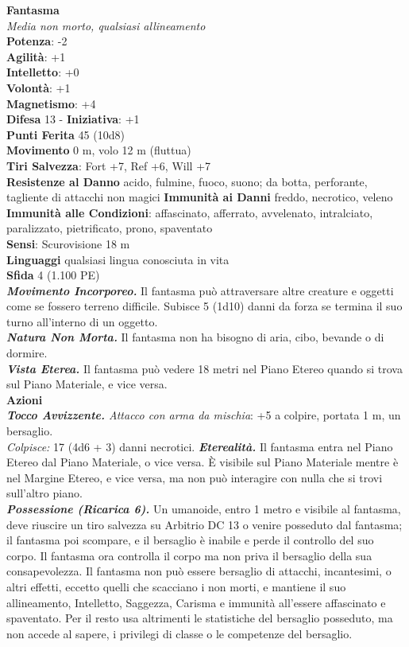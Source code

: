 \begin{multicols}{2}
\medskip\textbf{Fantasma}\\
\emph{Media non morto, qualsiasi allineamento}\\
\textbf{Potenza}: -2\\
\textbf{Agilità}: +1\\
\textbf{Intelletto}: +0\\
\textbf{Volontà}: +1\\
\textbf{Magnetismo}: +4\\
\textbf{Difesa} 13 - \textbf{Iniziativa}: +1\\
\textbf{Punti Ferita} 45 (10d8)\\
\textbf{Movimento} 0 m, volo 12 m (fluttua)\\
\textbf{Tiri Salvezza}: Fort +7, Ref +6, Will +7\\
\textbf{Resistenze al Danno} acido, fulmine, fuoco, suono; da botta, perforante, tagliente di attacchi non magici
\textbf{Immunità ai Danni} freddo, necrotico, veleno\\
\textbf{Immunità alle Condizioni}: affascinato, afferrato, avvelenato, intralciato, paralizzato, pietrificato, prono, spaventato \\
\textbf{Sensi}: Scurovisione 18 m\\
\textbf{Linguaggi} qualsiasi lingua conosciuta in vita\\
\textbf{Sfida} 4 (1.100 PE)\smallskip\\
\emph{\textbf{Movimento Incorporeo.}} Il fantasma può attraversare altre creature e oggetti come se fossero terreno difficile. Subisce 5 (1d10) danni da forza se termina il suo turno all'interno di un oggetto.\\
\emph{\textbf{Natura Non Morta.}} Il fantasma non ha bisogno di aria, cibo, bevande o di dormire.\\
\emph{\textbf{Vista Eterea.}} Il fantasma può vedere 18 metri nel Piano  Etereo quando si trova sul Piano Materiale, e vice versa.\\
\smallskip\textbf{Azioni}\\
\emph{\textbf{Tocco Avvizzente.} Attacco con arma da mischia}: +5 a colpire, portata 1 m, un bersaglio.\\
\emph{Colpisce:} 17 (4d6 + 3) danni necrotici. 
\emph{\textbf{Eterealità.}} Il fantasma entra nel Piano Etereo dal Piano Materiale, o vice versa. È visibile sul Piano Materiale mentre è nel Margine Etereo, e vice versa, ma non può interagire con nulla che si trovi sull'altro piano.\\
\emph{\textbf{Possessione (Ricarica 6).}} Un umanoide, entro 1 metro e visibile al fantasma, deve riuscire un tiro salvezza su Arbitrio DC 13 o venire posseduto dal fantasma; il fantasma poi scompare, e il bersaglio è inabile e perde il controllo del suo corpo. Il fantasma ora controlla il corpo ma non priva il bersaglio della sua consapevolezza. Il fantasma non può essere bersaglio di attacchi, incantesimi, o altri effetti, eccetto quelli che scacciano i non morti, e mantiene il suo allineamento, Intelletto, Saggezza, Carisma e immunità all'essere affascinato e spaventato. Per il resto usa altrimenti le statistiche del bersaglio posseduto, ma non accede al sapere, i privilegi di classe o le competenze del bersaglio.\\

\end{multicols}

